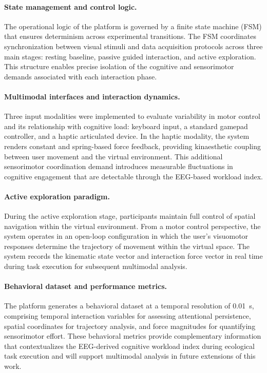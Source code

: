 \documentclass[10pt]{iopart}
\begin{document}
\paragraph{State management and control logic.}
The operational logic of the platform is governed by a finite
state machine (FSM) that ensures determinism across experimental
transitions. The FSM coordinates synchronization between visual
stimuli and data acquisition protocols across three main stages:
resting baseline, passive guided interaction, and active
exploration. This structure enables precise isolation of the
cognitive and sensorimotor demands associated with each
interaction phase.

\paragraph{Multimodal interfaces and interaction dynamics.}
Three input modalities were implemented to evaluate variability
in motor control and its relationship with cognitive load:
keyboard input, a standard gamepad controller, and a
haptic articulated device. In the haptic modality, the system
renders constant and spring-based force feedback, providing
kinaesthetic coupling between user movement and the virtual
environment. This additional sensorimotor coordination demand
introduces measurable fluctuations in cognitive engagement that
are detectable through the EEG-based workload index.

\paragraph{Active exploration paradigm.}
During the active exploration stage, participants maintain full
control of spatial navigation within the virtual environment.
From a motor control perspective, the system operates in an
open-loop configuration in which the user's visuomotor responses
determine the trajectory of movement within the virtual space.
The system records the kinematic state vector and interaction
force vector in real time during task execution for subsequent
multimodal analysis.

\paragraph{Behavioral dataset and performance metrics.}
The platform generates a behavioral dataset at a temporal
resolution of 0.01~s, comprising temporal interaction variables
for assessing attentional persistence, spatial coordinates for
trajectory analysis, and force magnitudes for quantifying
sensorimotor effort. These behavioral metrics provide
complementary information that contextualizes the EEG-derived
cognitive workload index during ecological task execution and
will support multimodal analysis in future extensions of this
work.
\end{document}
